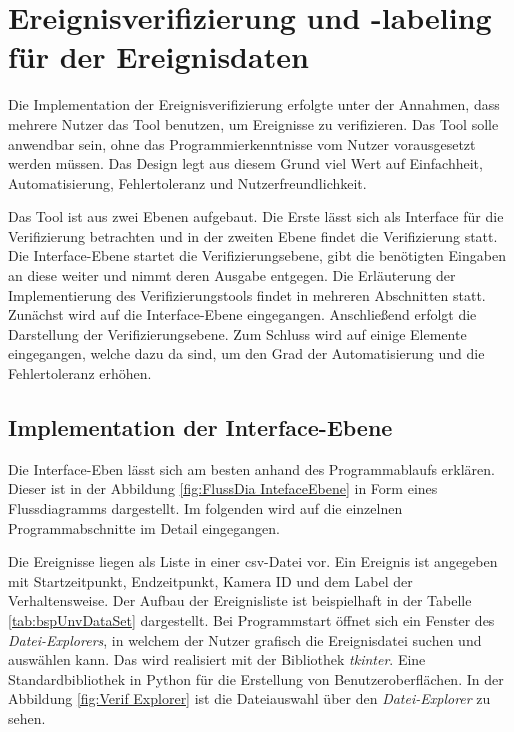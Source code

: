 \section{Ereignisverifizierung und -labeling für der Ereignisdaten}
Die Implementation der Ereignisverifizierung erfolgte unter der Annahmen, dass mehrere Nutzer das Tool benutzen, um Ereignisse zu verifizieren. Das Tool solle anwendbar sein, ohne das Programmierkenntnisse vom Nutzer vorausgesetzt werden müssen. Das Design legt aus diesem Grund viel Wert auf Einfachheit, Automatisierung, Fehlertoleranz und Nutzerfreundlichkeit. \par

Das Tool ist aus zwei Ebenen aufgebaut. Die Erste lässt sich als Interface für die Verifizierung betrachten und in der zweiten Ebene findet die Verifizierung statt. Die Interface-Ebene startet die Verifizierungsebene, gibt die benötigten Eingaben an diese weiter und nimmt deren Ausgabe entgegen. Die Erläuterung der Implementierung des Verifizierungstools findet in mehreren Abschnitten statt. Zunächst wird auf die Interface-Ebene eingegangen. Anschließend erfolgt die Darstellung der Verifizierungsebene. Zum Schluss wird auf einige Elemente eingegangen, welche dazu da sind, um den Grad der Automatisierung und die Fehlertoleranz erhöhen. 

\subsection{Implementation der Interface-Ebene} \label{sec:Umsetz VeriInterfaceEbene}
Die Interface-Eben lässt sich am besten anhand des Programmablaufs erklären. Dieser ist in der Abbildung \ref{fig:FlussDia IntefaceEbene} in Form eines Flussdiagramms dargestellt. Im folgenden wird auf die einzelnen Programmabschnitte im Detail eingegangen. 


Die Ereignisse liegen als Liste in einer csv-Datei vor. Ein Ereignis ist angegeben mit Startzeitpunkt, Endzeitpunkt, Kamera ID und dem Label der Verhaltensweise. Der Aufbau der Ereignisliste ist beispielhaft in der Tabelle \ref{tab:bspUnvDataSet} dargestellt. Bei Programmstart öffnet sich ein Fenster des \textit{Datei-Explorers}, in welchem der Nutzer grafisch die Ereignisdatei suchen und auswählen kann. Das wird realisiert mit der \gls{Bibliothek} \textit{tkinter}. Eine Standardbibliothek in Python für die Erstellung von Benutzeroberflächen. In der Abbildung \ref{fig:Verif Explorer} ist die Dateiauswahl über den \textit{Datei-Explorer} zu sehen.


